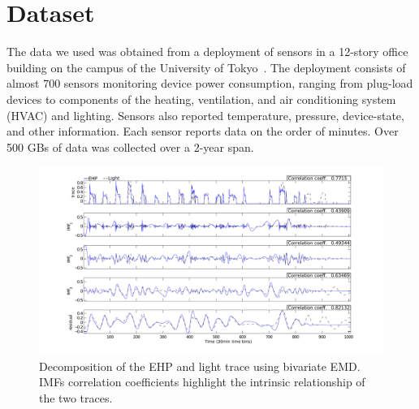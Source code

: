 \section{Dataset}
The data we used was obtained from a deployment of sensors in a 12-story office building
on the campus of the University of Tokyo~\cite{gutp, ogawa:lncs2011}.  The deployment consists of 
almost 700 sensors monitoring device power consumption, ranging from plug-load devices to components of the
heating, ventilation, and air conditioning system (HVAC) and lighting.  Sensors also reported temperature, 
pressure, device-state, and other information.  Each sensor reports data on the
order of minutes.  Over 500 GBs of data was collected over a 2-year span.

\begin{figure}[tb]
\hspace{-2cm}
\includegraphics[width=1.2\textwidth]{figs/emd_25_26-eps-converted-to}
\vspace{-1cm}
\caption{Decomposition of the EHP and light trace using bivariate EMD. IMFs correlation coefficients highlight the intrinsic relationship of the two traces.}
\label{fig:emd}
\end{figure}



